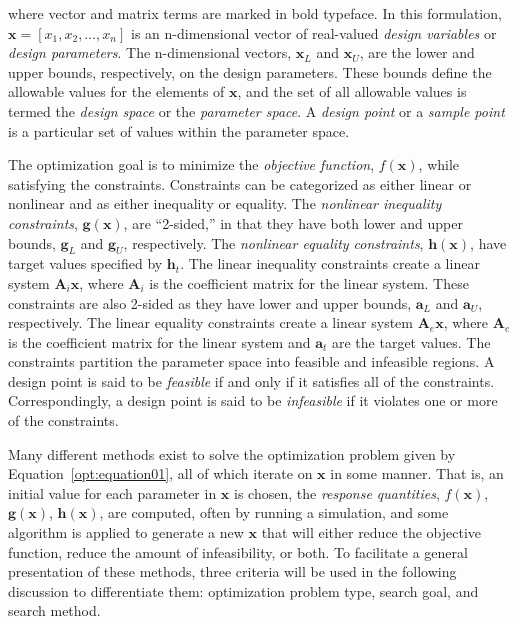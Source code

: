 where vector and matrix terms are marked in bold typeface. In this
formulation, $\mathbf{x}=[x_{1},x_{2},\ldots,x_{n}]$ is an
n-dimensional vector of real-valued \emph{design variables} or
\emph{design parameters}. The n-dimensional vectors, $\mathbf{x}_{L}$
and $\mathbf{x}_U$, are the lower and upper bounds, respectively, on
the design parameters. These bounds define the allowable values for
the elements of $\mathbf{x}$, and the set of all allowable values is
termed the \emph{design space} or the \emph{parameter space}. A
\emph{design point} or a \emph{sample point} is a particular set of 
values within the parameter space.

The optimization goal is to minimize the \emph{objective function},
$f(\mathbf{x})$, while satisfying the constraints. Constraints can be
categorized as either linear or nonlinear and as either inequality or
equality. The \emph{nonlinear inequality constraints},
$\mathbf{g(x)}$, are ``2-sided,'' in that they have both lower and
upper bounds, $\mathbf{g}_L$ and $\mathbf{g}_U$, respectively. The
\emph{nonlinear equality constraints}, $\mathbf{h(x)}$, have target
values specified by $\mathbf{h}_{t}$. The linear inequality
constraints create a linear system $\mathbf{A}_i\mathbf{x}$, where
$\mathbf{A}_i$ is the coefficient matrix for the linear system. These
constraints are also 2-sided as they have lower and upper bounds,
$\mathbf{a}_L$ and $\mathbf{a}_U$, respectively. The linear equality
constraints create a linear system $\mathbf{A}_e\mathbf{x}$, where
$\mathbf{A}_e$ is the coefficient matrix for the linear system and
$\mathbf{a}_{t}$ are the target values. The constraints partition the
parameter space into feasible and infeasible regions. A design point
is said to be \emph{feasible} if and only if it satisfies all of the
constraints. Correspondingly, a design point is said to be
\emph{infeasible} if it violates one or more of the constraints.

Many different methods exist to solve the optimization problem given
by Equation~\ref{opt:equation01}, all of which iterate on
$\mathbf{x}$ in some manner. That is, an initial value for each
parameter in $\mathbf{x}$ is chosen, the \emph{response quantities},
$f(\mathbf{x})$, $\mathbf{g(x)}$, $\mathbf{h(x)}$, are computed, often
by running a simulation, and some algorithm is applied to generate a
new $\mathbf{x}$ that will either reduce the objective function,
reduce the amount of infeasibility, or both. To facilitate a general
presentation of these methods, three criteria will be used in the
following discussion to differentiate them: optimization problem type,
search goal, and search method.

